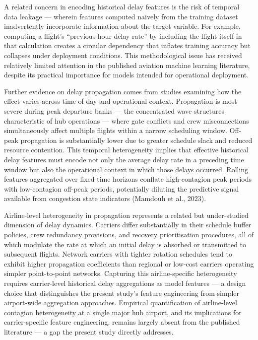 \documentclass{report}
\begin{document}
A related concern in encoding historical delay features is the risk of temporal data leakage --- wherein features computed naively from the training dataset inadvertently incorporate information about the target variable. For example, computing a flight's ``previous hour delay rate'' by including the flight itself in that calculation creates a circular dependency that inflates training accuracy but collapses under deployment conditions. This methodological issue has received relatively limited attention in the published aviation machine learning literature, despite its practical importance for models intended for operational deployment.

Further evidence on delay propagation comes from studies examining how the
effect varies across time-of-day and operational context. Propagation is most
severe during peak departure banks --- the concentrated wave structures
characteristic of hub operations --- where gate conflicts and crew
misconnections simultaneously affect multiple flights within a narrow
scheduling window. Off-peak propagation is substantially lower due to greater
schedule slack and reduced resource contention. This temporal heterogeneity
implies that effective historical delay features must encode not only the
average delay rate in a preceding time window but also the operational context
in which those delays occurred. Rolling features aggregated over fixed time
horizons conflate high-contagion peak periods with low-contagion off-peak
periods, potentially diluting the predictive signal available from congestion
state indicators (Mamdouh et al., 2023).

Airline-level heterogeneity in propagation represents a related but
under-studied dimension of delay dynamics. Carriers differ substantially in
their schedule buffer policies, crew redundancy provisions, and recovery
prioritisation procedures, all of which modulate the rate at which an initial
delay is absorbed or transmitted to subsequent flights. Network carriers with
tighter rotation schedules tend to exhibit higher propagation coefficients than
regional or low-cost carriers operating simpler point-to-point networks.
Capturing this airline-specific heterogeneity requires carrier-level historical
delay aggregations as model features --- a design choice that distinguishes the
present study's feature engineering from simpler airport-wide aggregation
approaches. Empirical quantification of airline-level contagion heterogeneity at a single 
major hub airport, and its implications for carrier-specific feature engineering, 
remains largely absent from the published literature --- a gap the present study 
directly addresses.
\end{document}
